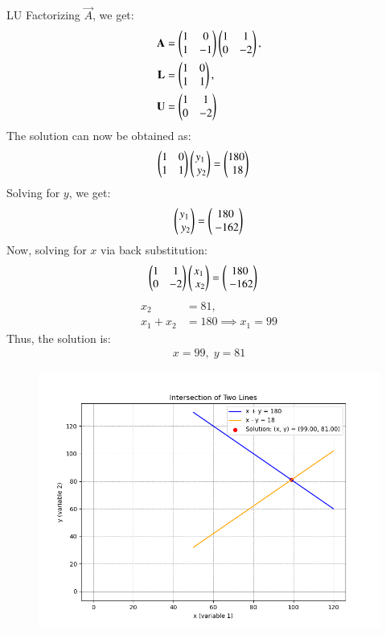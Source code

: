 \documentclass[journal]{IEEEtran}
\begin{document}
LU Factorizing \(\vec{A}\), we get:
\begin{align}
    \mathbf{A} &= \begin{pmatrix}1 & 0\\1 & -1\end{pmatrix}\begin{pmatrix}1 & 1\\0 & -2\end{pmatrix}, \\
    \mathbf{L} &= \begin{pmatrix}1 & 0\\1 & 1\end{pmatrix}, \\
    \mathbf{U} &= \begin{pmatrix}1 & 1\\0 & -2\end{pmatrix}
\end{align}
The solution can now be obtained as:
\begin{align}
    \begin{pmatrix}1 & 0\\1 & 1\end{pmatrix}\begin{pmatrix}y_1 \\\ y_2\end{pmatrix} &= \begin{pmatrix}180 \\\ 18\end{pmatrix}
\end{align}
Solving for \(y\), we get:
\begin{align}
    \begin{pmatrix}y_1 \\\ y_2\end{pmatrix} = \begin{pmatrix}180 \\\ -162\end{pmatrix}
\end{align}
Now, solving for \(x\) via back substitution:
\begin{align}
    \begin{pmatrix}1 & 1\\0 & -2\end{pmatrix}\begin{pmatrix}x_1 \\\ x_2\end{pmatrix} &= \begin{pmatrix}180 \\\ -162\end{pmatrix}
\end{align}
\begin{align}
    x_2 &= 81, \\
    x_1 + x_2 &= 180 \implies x_1 = 99
\end{align}
Thus, the solution is:
\begin{align}
    x = 99, \; y = 81
\end{align}
\begin{figure}[H]
    \centering
    \includegraphics[width=\columnwidth]{figs/figs.png}
\end{figure}
\end{document}

